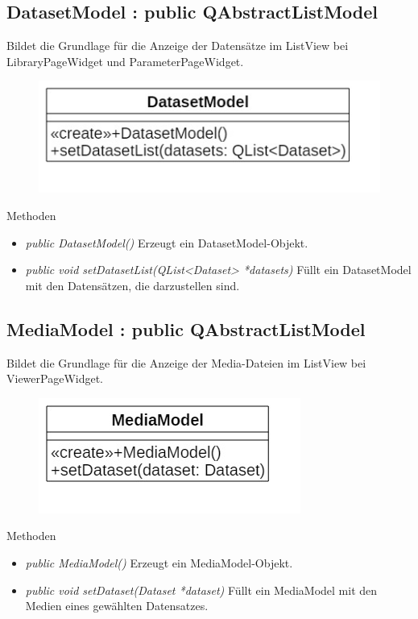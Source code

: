 \subsection*{DatasetModel : public QAbstractListModel}
Bildet die Grundlage für die Anzeige der Datensätze im ListView bei LibraryPageWidget und ParameterPageWidget.

\begin{figure}[H]
	\centering
	\includegraphics[scale=0.5]{img/Klassendiagramm/Klassen/View/DatasetModel}
	\label{fig:datasetModel}
\end{figure}

Methoden
\begin{itemize}
	\item\textit{public DatasetModel()}
	Erzeugt ein DatasetModel-Objekt.
	\item\textit{public void setDatasetList(QList<Dataset> *datasets)}
	Füllt ein DatasetModel mit den Datensätzen, die darzustellen sind.
\end{itemize}

\subsection*{MediaModel : public QAbstractListModel}
Bildet die Grundlage für die Anzeige der Media-Dateien im ListView bei ViewerPageWidget.

\begin{figure}[H]
	\centering
	\includegraphics[scale=0.5]{img/Klassendiagramm/Klassen/View/MediaModel}
	\label{fig:mediaModel}
\end{figure}

Methoden
\begin{itemize}
	\item\textit{public MediaModel()}
	Erzeugt ein MediaModel-Objekt.
	\item\textit{public void setDataset(Dataset *dataset)}
	Füllt ein MediaModel mit den Medien eines gewählten Datensatzes.
\end{itemize}

